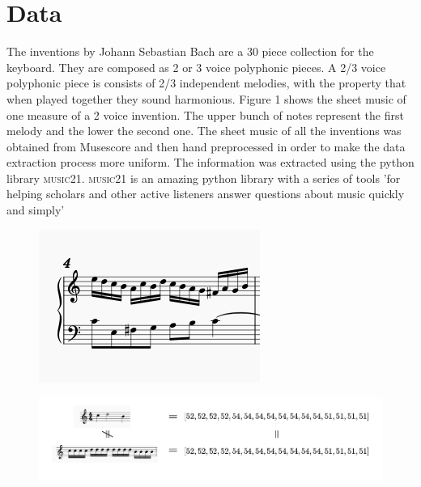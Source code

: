 \documentclass{article}
\begin{document}
\section*{Data}
The inventions by Johann Sebastian Bach are a 30 piece collection for the keyboard. They are composed as 2 or 3 voice polyphonic pieces. A 2/3 voice polyphonic piece is consists of 2/3 independent melodies, with the property that when played together they sound harmonious. Figure 1 shows the sheet music of one measure of a 2 voice invention. The upper bunch of notes represent the first melody and the lower the second one.
\noindent
The sheet music of all the inventions was obtained from Musescore and then hand preprocessed in order to make the data extraction process more uniform. The information was extracted using the python library \textsc{music21}. \textsc{music21} is an amazing python library with a series of tools 'for helping scholars and other active listeners answer questions about music quickly and simply'
\begin{figure}[H]
\begin{minipage}{.4\textwidth}
  \centering
  \includegraphics[width=.6\linewidth]{Images/polyphonic.png}
  \label{fig:test1}
\end{minipage}%
\begin{minipage}{.5\textwidth}
  \centering
  \includegraphics[width=1.3\linewidth]{Images/PianoRollProblem.png}
  \label{fig:test2}
\end{minipage}
\end{figure}
\end{document}
